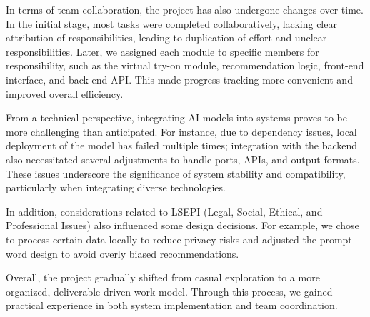 In terms of team collaboration, the project has also undergone changes over time. In the initial stage, most tasks were completed collaboratively, lacking clear attribution of responsibilities, leading to duplication of effort and unclear responsibilities. Later, we assigned each module to specific members for responsibility, such as the virtual try-on module, recommendation logic, front-end interface, and back-end API. This made progress tracking more convenient and improved overall efficiency.

From a technical perspective, integrating AI models into systems proves to be more challenging than anticipated. For instance, due to dependency issues, local deployment of the model has failed multiple times; integration with the backend also necessitated several adjustments to handle ports, APIs, and output formats. These issues underscore the significance of system stability and compatibility, particularly when integrating diverse technologies.

In addition, considerations related to LSEPI (Legal, Social, Ethical, and Professional Issues) also influenced some design decisions. For example, we chose to process certain data locally to reduce privacy risks and adjusted the prompt word design to avoid overly biased recommendations.

Overall, the project gradually shifted from casual exploration to a more organized, deliverable-driven work model. Through this process, we gained practical experience in both system implementation and team coordination.



